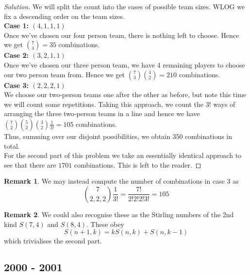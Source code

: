 \documentclass[11pt]{article}
\theoremstyle{definition}
\newtheorem*{remark}{Remark}
\begin{document}
\begin{proof}[Solution]
    We will split the count into the cases of possible team sizes. WLOG we fix a descending order on the team sizes. \\

    {\bf Case 1: $(4, 1, 1, 1)$} \\
    Once we've chosen our four person team, there is nothing left to choose. Hence we get $\binom{7}{4} = 35$ 
    combinations. \\ 

    {\bf Case 2: $(3, 2, 1, 1)$} \\
    Once we've chosen our three person team, we have 4 remaining players to choose our two person team from. Hence 
    we get $\binom{7}{3}\binom{4}{2} = 210$ combinations. \\ 
    
    {\bf Case 3: $(2, 2, 2, 1)$} \\
    We choose our two-person teams one after the other as before, but note this time we will count some repetitions. 
    Taking this approach, we count the $3!$ ways of arranging the three two-person teams in a line and hence we have 
    $\binom{7}{2}\binom{5}{2}\binom{3}{2}\frac{1}{3!} = 105$ combinations. \\ 

    Thus, summing over our disjoint possibilities, we obtain $350$ combinations in total. \\ 

    For the second part of this problem we take an essentially identical approach to see that there are $1701$ combinations. 
    This is left to the reader.
\end{proof}

\begin{remark}
    We may instead compute the number of combinations in case 3 as 
    \[\binom{7}{2,2,2} \frac{1}{3!} = \frac{7!}{2!2!2!3!} = 105\] 
\end{remark}

\begin{remark}
    We could also recognise these as the Stirling numbers of the 2nd kind $S(7, 4)$ and $S(8, 4)$. These obey 
    \[S(n+1, k) = kS(n, k) + S(n, k-1)\] which trivialises the second part.
\end{remark}

\newpage

\subsection{2000 - 2001}
\end{document}
